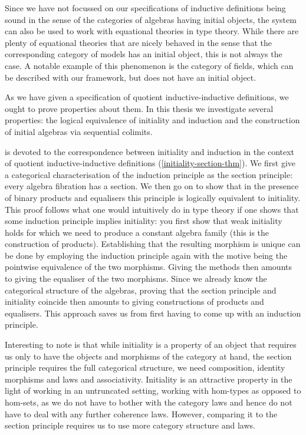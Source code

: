 Since we have not focussed on our specifications of inductive
definitions being sound in the sense of the categories of algebras
having initial objects, the system can also be used to work with
equational theories in type theory. While there are plenty of
equational theories that are nicely behaved in the sense that the
corresponding category of models has an initial object, this is not
always the case. A notable example of this phenomenon is the category
of fields, which can be described with our framework, but does not
have an initial object.

As we have given a specification of quotient inductive-inductive
definitions, we ought to prove properties about them. In this thesis
we investigate several properties: the logical equivalence of
initiality and induction and the construction of initial algebras via
sequential colimits.

 is devoted to the correspondence between initiality
and induction in the context of quotient inductive-inductive
definitions (\cref{initiality-section-thm}). We first give a
categorical characterisation of the induction principle as the section
principle: every algebra fibration has a section. We then go on to
show that in the presence of binary products and equalisers this
principle is logically equivalent to initiality. This proof follows
what one would intuitively do in type theory if one shows that some
induction principle implies initiality: you first show that weak
initiality holds for which we need to produce a constant algebra
family (this is the construction of products). Establishing that the
resulting morphism is unique can be done by employing the induction
principle again with the motive being the pointwise equivalence of the
two morphisms. Giving the methods then amounts to giving the equaliser
of the two morphisms. Since we already know the categorical structure
of the algebras, proving that the section principle and initiality
coincide then amounts to giving constructions of products and
equalisers. This approach saves us from first having to come up with
an induction principle.

Interesting to note is that while initiality is a property of an
object that requires us only to have the objects and morphisms of the
category at hand, the section principle requires the full categorical
structure, \ie we need composition, identity morphisms and laws and
associativity. Initiality is an attractive property in the light of
working in an untruncated setting, \ie working with hom-types as
opposed to hom-sets, as we do not have to bother with the category
laws and hence do not have to deal with any further coherence
laws. However, comparing it to the section principle requires us to
use more category structure and laws.

